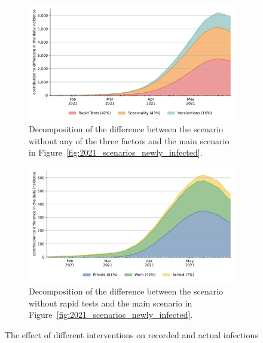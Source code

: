 \begin{figure}[!tp]
    \begin{subfigure}[b]{0.475\textwidth}
        \centering
        \includegraphics[width=\textwidth]{figures/results/figures/full_decomposition_channels_area}
        \caption{Decomposition of the difference between the scenario without any of the
            three factors and the main scenario in
            Figure~\ref{fig:2021_scenarios_newly_infected}.}
        \label{fig:2021_scenarios_decomposition}
    \end{subfigure}
    \hfill
    \begin{subfigure}[b]{0.475\textwidth}
        \centering
        \includegraphics[width=\textwidth]{figures/results/figures/full_decomposition_rapid_tests_area}
        \caption{Decomposition of the difference between the scenario without rapid
            tests and the main scenario in
            Figure~\ref{fig:2021_scenarios_newly_infected}.}
        \label{fig:2021_scenarios_decomposition_tests}
    \end{subfigure}

    \caption{The effect of different interventions on recorded and actual infections}
    \label{fig:2021_scenarios_broad}


\end{figure}
